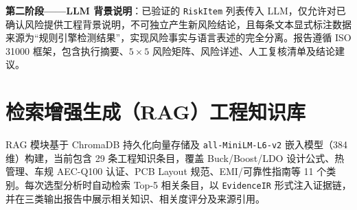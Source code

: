 \textbf{第二阶段——LLM 背景说明}：已验证的 \texttt{RiskItem} 列表传入 LLM，仅允许对已确认风险提供工程背景说明，不可独立产生新风险结论，且每条文本显式标注数据来源为“规则引擎检测结果”，实现风险事实与语言表述的完全分离。报告遵循 ISO 31000\cite{iso31000} 框架，包含执行摘要、$5\times 5$ 风险矩阵\cite{iec60812}、风险详述、人工复核清单及结论建议。

\section{检索增强生成（RAG）工程知识库}

RAG 模块基于 ChromaDB 持久化向量存储及 \texttt{all-MiniLM-L6-v2} 嵌入模型（384 维）构建\cite{lewis2020rag}，当前包含 29 条工程知识条目，覆盖 Buck/Boost/LDO 设计公式、热管理、车规 AEC-Q100 认证\cite{aecq100}、PCB Layout 规范\cite{ipc2221,ipc2152}、EMI/可靠性指南等 11 个类别。每次选型分析时自动检索 Top-5 相关条目，以 \texttt{EvidenceIR} 形式注入证据链，并在三类输出报告中展示相关知识、相关度评分及来源引用。
